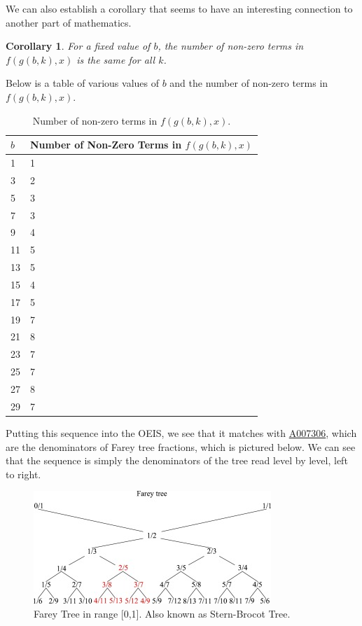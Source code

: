 \documentclass{article}
\newtheorem{corollary}{Corollary}
\begin{document}
	We can also establish a corollary that seems to have an interesting connection to another part of mathematics.
	\begin{corollary}
		For a fixed value of $b$, the number of non-zero terms in $f(g(b,k),x)$ is the same for all $k$.
	\end{corollary}
	Below is a table of various values of $b$ and the number of non-zero terms in $f(g(b,k),x)$.
	
	\begin{table}[H]
		\centering
		\begin{tabular}{|l||l|}
			\hline
			$b$ & Number of Non-Zero Terms in $f(g(b,k),x)$ \\
			\hline\hline
			1 & 1 \\
			\hline
			3 & 2 \\
			\hline
			5 & 3 \\
			\hline
			7 & 3 \\
			\hline
			9 & 4 \\
			\hline
			11 & 5 \\
			\hline
			13 & 5 \\
			\hline
			15 & 4 \\
			\hline
			17 & 5 \\
			\hline
			19 & 7 \\
			\hline
			21 & 8 \\
			\hline
			23 & 7 \\
			\hline
			25 & 7 \\
			\hline
			27 & 8 \\
			\hline
			29 & 7 \\
			\hline
		\end{tabular}
		\caption{Number of non-zero terms in $f(g(b,k),x)$.}
	\end{table}
	
	Putting this sequence into the OEIS, we see that it matches with \href{https://oeis.org/A007306}{A007306}, which are the denominators of Farey tree fractions, which is pictured below.
	We can see that the sequence is simply the denominators of the tree read level by level, left to right.
	
	\begin{figure}[H]
		\centering
		\includegraphics[width=0.8\textwidth]{farey_tree.jpg}
		\caption{Farey Tree in range [0,1]. Also known as Stern-Brocot Tree.}
	\end{figure}
\end{document}
